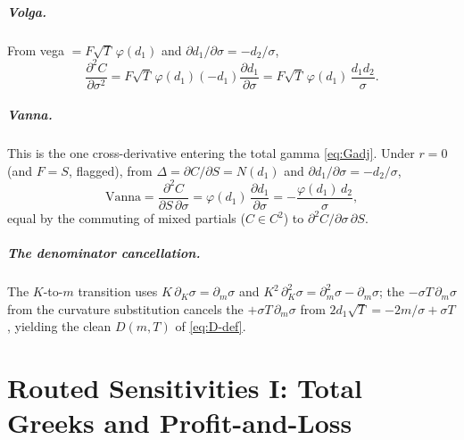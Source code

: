 \documentclass[11pt]{book}
\theoremstyle{plain}
\theoremstyle{definition}
\theoremstyle{remark}
\newcommand{\mln}{m}                             %
\newcommand{\npdf}{\varphi}                      %
\newcommand{\ncdf}{N}                            %
\newcommand{\Vanna}{\mathrm{Vanna}}
\newcommand{\SigmaM}{\Sigma_M}                   %
\newcommand{\pd}[2]{\frac{\partial #1}{\partial #2}}          %
\newcommand{\pdd}[2]{\frac{\partial^2 #1}{\partial #2^2}}     %
\newcommand{\pdc}[3]{\frac{\partial^2 #1}{\partial #2\,\partial #3}} %
\newcommand{\atfixed}[2]{\left.#1\right|_{#2}}                %
\begin{document}
\paragraph{Volga.} From vega $= F\sqrt{T}\,\npdf(d_1)$ and
$\partial d_1/\partial\sigma = -d_2/\sigma$,
\[
\pdd{C}{\sigma} = F\sqrt{T}\,\npdf(d_1)(-d_1)\pd{d_1}{\sigma}
= F\sqrt{T}\,\npdf(d_1)\,\frac{d_1 d_2}{\sigma}.
\]

\paragraph{Vanna.} This is the one cross-derivative entering the total gamma
\eqref{eq:Gadj}. Under $r=0$ (and $F=S$, flagged), from
$\Delta = \partial C/\partial S = \ncdf(d_1)$ and
$\partial d_1/\partial\sigma = -d_2/\sigma$,
\[
\Vanna = \pdc{C}{S}{\sigma} = \npdf(d_1)\,\pd{d_1}{\sigma}
= -\frac{\npdf(d_1)\,d_2}{\sigma},
\]
equal by the commuting of mixed partials ($C\in C^2$) to
$\partial^2 C/\partial\sigma\,\partial S$.

\paragraph{The denominator cancellation.} The $K$-to-$\mln$ transition uses
$K\,\partial_K\sigma = \partial_\mln\sigma$ and
$K^2\,\partial_K^2\sigma = \partial_\mln^2\sigma - \partial_\mln\sigma$; the
$-\sigma T\,\partial_\mln\sigma$ from the curvature substitution cancels the
$+\sigma T\,\partial_\mln\sigma$ from $2 d_1\sqrt{T} = -2\mln/\sigma + \sigma T$,
yielding the clean $D(\mln,T)$ of \eqref{eq:D-def}.

\newcommand{\evalat}[2]{\bigl(#1\bigr)(#2)}

\chapter{Routed Sensitivities I: Total Greeks and Profit-and-Loss}
\label{ch:routed-one}
\end{document}
